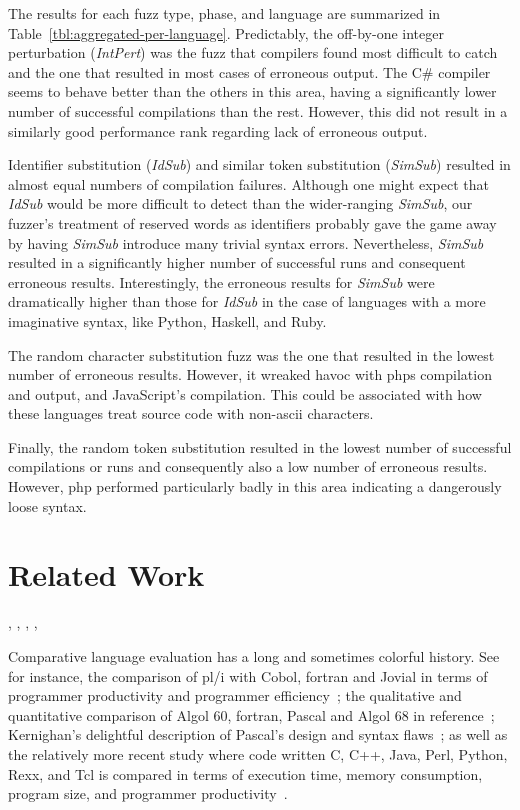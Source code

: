 \documentclass[10pt]{sigplanconf}
\begin{document}
The results for each fuzz type, phase, and language are summarized in
Table~\ref{tbl:aggregated-per-language}.
Predictably, the off-by-one integer perturbation ({\em IntPert})
was the fuzz that
compilers found most difficult to catch and the one that resulted
in most cases of erroneous output.
The C\# compiler seems to behave better than the others in this area,
having a significantly lower number of successful compilations than the
rest.
However, this did not result in a similarly good performance rank
regarding lack of erroneous output.

Identifier substitution ({\em IdSub}) and similar token substitution
({\em SimSub}) resulted in almost equal numbers of compilation failures.
Although one might expect that {\em IdSub} would be more difficult
to detect than the wider-ranging {\em SimSub},
our fuzzer's treatment of reserved words as identifiers
probably gave the game away by having {\em SimSub} introduce many
trivial syntax errors.
Nevertheless, {\em SimSub} resulted in a significantly higher number
of successful runs and consequent erroneous results.
Interestingly,
the erroneous results for {\em SimSub} were dramatically higher
than those for {\em IdSub} in the case of
languages with a more imaginative syntax, like Python, Haskell, and Ruby.

The random character substitution fuzz was the one that resulted
in the lowest number of erroneous results.
However, it wreaked havoc with {\sc php}s compilation and output,
and JavaScript's compilation.
This could be associated with how these languages treat source code
with non-{\sc ascii} characters.

Finally, the random token substitution resulted in the lowest number
of successful compilations or runs and consequently
also a low number of erroneous results.
However,
{\sc php} performed particularly badly in this area indicating a
dangerously loose syntax.

\section{Related Work} %
\label{sec:related}


\cite{JIHA10}, \cite{HANE10}, \cite{STHA11}, \cite{KHRT12}, \cite{LFGC07}

Comparative language evaluation has a long and sometimes colorful history.
See for instance,
the comparison of {\sc pl/i} with Cobol, {\sc fortran} and Jovial in
terms of programmer productivity and programmer efficiency~\cite{RWSB68};
the qualitative and quantitative comparison of Algol 60,
{\sc fortran}, Pascal and Algol 68 in reference~\cite{BOJO80};
Kernighan's delightful description of
Pascal's design and syntax flaws~\cite{Ker81};
as well as the relatively more recent study where code written
C, C++, Java, Perl, Python, Rexx, and Tcl
is compared in terms of execution time, memory consumption,
program size, and programmer productivity~\cite{PREC00}.
\end{document}
